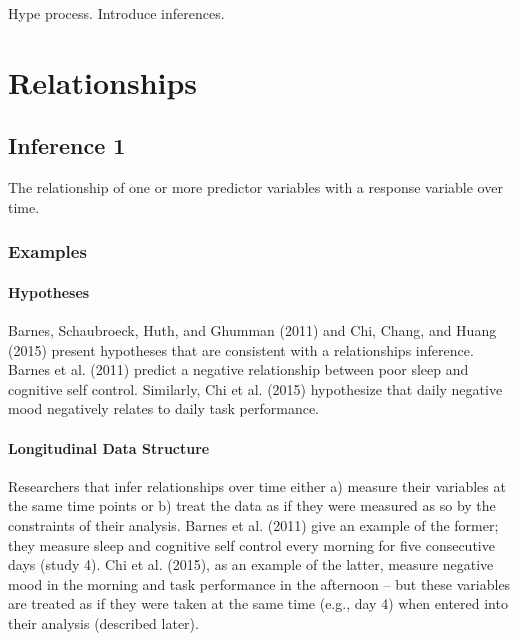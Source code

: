\documentclass[english,,man]{apa6}
\let\oldparagraph\paragraph
\renewcommand{\paragraph}[1]{\oldparagraph{#1}\mbox{}}
\theoremstyle{definition}
\theoremstyle{definition}
\theoremstyle{definition}
\theoremstyle{remark}
\begin{document}
Hype process. Introduce inferences.

\hypertarget{relationships}{%
\section{Relationships}\label{relationships}}

\hypertarget{inference-1}{%
\subsection{Inference 1}\label{inference-1}}

The relationship of one or more predictor variables with a response
variable over time.

\hypertarget{examples}{%
\subsubsection{Examples}\label{examples}}

\hypertarget{hypotheses}{%
\paragraph{Hypotheses}\label{hypotheses}}

Barnes, Schaubroeck, Huth, and Ghumman (2011) and Chi, Chang, and Huang
(2015) present hypotheses that are consistent with a relationships
inference. Barnes et al. (2011) predict a negative relationship between
poor sleep and cognitive self control. Similarly, Chi et al. (2015)
hypothesize that daily negative mood negatively relates to daily task
performance.

\hypertarget{longitudinal-data-structure}{%
\paragraph{Longitudinal Data
Structure}\label{longitudinal-data-structure}}

Researchers that infer relationships over time either a) measure their
variables at the same time points or b) treat the data as if they were
measured as so by the constraints of their analysis. Barnes et al.
(2011) give an example of the former; they measure sleep and cognitive
self control every morning for five consecutive days (study 4). Chi et
al. (2015), as an example of the latter, measure negative mood in the
morning and task performance in the afternoon -- but these variables are
treated as if they were taken at the same time (e.g., day 4) when
entered into their analysis (described later).
\end{document}
